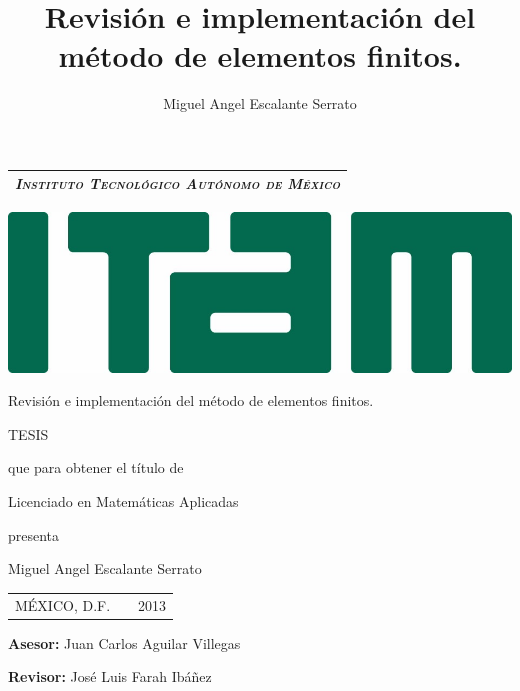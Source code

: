 \documentclass[12pt,spanish,oneside]{book}
\author{Miguel Angel Escalante Serrato}
\title{Revisión e implementación del método de elementos finitos.}
\theoremstyle{plain}
\numberwithin{equation}{chapter}
\theoremstyle{definition}
\theoremstyle{remark}
\begin{document}
%
\newpage

\thispagestyle{empty}

\setcounter{page}{1}
\begin{center}
\begin{tabular}{c}
\hline
 \large \emph{\textsc{Instituto Tecnológico Autónomo de México}} \\
 
\hline
\end{tabular}

\vspace{10pt}

\centering
\includegraphics[width=0.8\linewidth]{Logo_ITAM.jpeg}

\vspace{20pt}


\Large Revisión e implementación del método de elementos finitos.



\vspace{30pt}

\normalsize TESIS

\vspace{12pt}

que para obtener el título de

\vspace{12pt}

Licenciado en Matemáticas Aplicadas

\vspace{12pt}

presenta

\vspace{12pt}

Miguel Angel Escalante Serrato

\vspace{32pt}

\begin{tabular}{lcr}
MÉXICO, D.F. & \hspace{80pt} & 2013
\end{tabular}

\textbf{Asesor:} Juan Carlos Aguilar Villegas

\textbf{Revisor:} José Luis Farah Ibáñez
\end{center}
\end{document}
